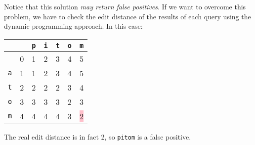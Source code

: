 Notice that this solution \emph{may return false positives}. If we want to
overcome this problem, we have to check the edit distance of the results
of each query using the dynamic programming approach. In this case:
%
\begin{table}[H]
  \centering
  \begin{tabular}{c|c|c|c|c|c|c|}
            &   & {\tt p} & {\tt i} & {\tt t} & {\tt o} & {\tt m} \\ \hline
            & 0 &    1    &    2    &    3    &    4    &    5 \\ \hline
    {\tt a} & 1 &    1    &    2    &    3    &    4    &    5 \\ \hline
    {\tt t} & 2 &    2    &    2    &    2    &    3    &    4 \\ \hline
    {\tt o} & 3 &    3    &    3    &    3    &    2    &    3 \\ \hline
    {\tt m} & 4 &    4    &    4    &    4    &    3    & \colorbox{pink}{2} \\
    \hline
  \end{tabular}
\end{table}
%
The real edit distance is in fact 2, so \texttt{pitom} is a false positive.
